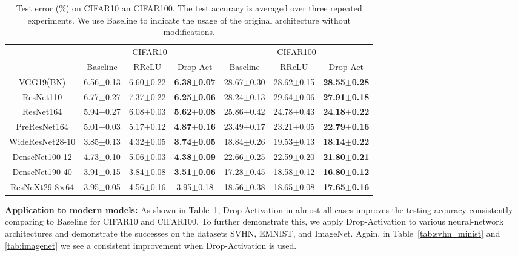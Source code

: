 \documentclass[11pt]{article}
\begin{document}
\begin{table}[htbp]
\small
  \centering
  
    \begin{tabular}{|c|c|c|c|c|c|c|}
    \toprule
          & \multicolumn{3}{c|}{CIFAR10} & \multicolumn{3}{c|}{CIFAR100} \\
\cmidrule{2-7}          & Baseline & RReLU & Drop-Act & Baseline & RReLU & Drop-Act \\
    \midrule
    VGG19(BN) & 6.56$\pm$0.13  & 6.60$\pm$0.22  & \textbf{6.38$\pm$0.07}  & 28.67$\pm$0.30     & 28.62$\pm$0.15     & \textbf{28.55$\pm$0.28} \\
    ResNet110 & 6.77$\pm$0.27  & 7.37$\pm$0.22  & \textbf{6.25$\pm$0.06}  & 28.24$\pm$0.13     & 29.64$\pm$0.06     & \textbf{27.91$\pm$0.18} \\
    ResNet164 & 5.94$\pm$0.27     & 6.08$\pm$0.03     & \textbf{5.62$\pm$0.08}     & 25.86$\pm$0.42  & 24.78$\pm$0.43  & \textbf{24.18$\pm$0.22}  \\
    PreResNet164 & 5.01$\pm$0.03  & 5.17$\pm$0.12  & \textbf{4.87$\pm$0.16}  & 23.49$\pm$0.17  & 23.21$\pm$0.05  & \textbf{22.79$\pm$0.16}  \\
    WideResNet28-10 & 3.85$\pm$0.13  & 4.32$\pm$0.05  & \textbf{3.74$\pm$0.05}  & 18.84$\pm$0.26  & 19.53$\pm$0.13  & \textbf{18.14$\pm$0.22}  \\
    DenseNet100-12 & 4.73$\pm$0.10  & 5.06$\pm$0.03  & \textbf{4.38$\pm$0.09}  & 22.66$\pm$0.25  & 22.59$\pm$0.20  & \textbf{21.80$\pm$0.21}  \\
    DenseNet190-40 & 3.91$\pm$0.15  &   3.84$\pm$0.08    & \textbf{3.51$\pm$0.06}  & 17.28$\pm$0.45   &   18.58$\pm$0.12    & \textbf{16.80$\pm$0.12}  \\
    ResNeXt29-8$\times$64 & 3.95$\pm$0.05  & 4.56$\pm$0.16  & 3.95$\pm$0.18  & 18.56$\pm$0.38  & 18.65$\pm$0.08  & \textbf{17.65$\pm$0.16}  \\
    \bottomrule
    \end{tabular}

  \caption{Test error (\%) on CIFAR10 an CIFAR100. The test accuracy is averaged over three repeated experiments. We use Baseline to indicate the usage of the original architecture without modifications.}
  \label{tab:c100}
  \vspace{-0.5cm}
\end{table}

\textbf{Application to modern models:} As shown in Table~\ref{tab:c100}, Drop-Activation in almost all cases improves the testing accuracy consistently comparing to Baseline for CIFAR10 and CIFAR100. To further demonstrate this, we apply Drop-Activation to various neural-network architectures and demonstrate the successes on the datasets SVHN, EMNIST, and ImageNet. Again, in Table~\ref{tab:svhn_minist} and \ref{tab:imagenet} we see a consistent improvement when Drop-Activation is used. 
\end{document}

